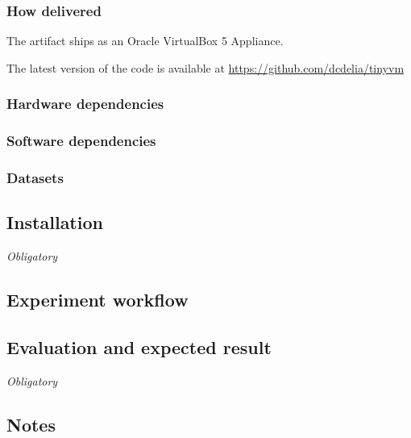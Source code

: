 \documentclass{sigplanconf}
\begin{document}
\subsubsection{How delivered}

The artifact ships as an Oracle VirtualBox 5 Appliance.

The latest version of the code is available at \url{https://github.com/dcdelia/tinyvm}

\subsubsection{Hardware dependencies}

\subsubsection{Software dependencies}

\subsubsection{Datasets}

\subsection{Installation}

{\em Obligatory}

\subsection{Experiment workflow}

\subsection{Evaluation and expected result}

{\em Obligatory}

\subsection{Notes}

\end{document}
